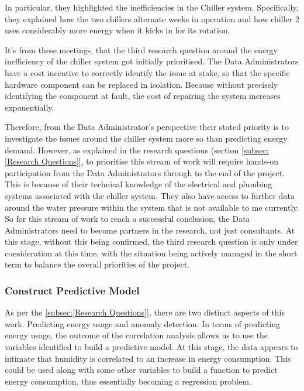 \documentclass[12pt]{scrartcl}
\begin{document}
In particular, they highlighted the inefficiencies in the Chiller system. Specifically, they explained how the two chillers alternate weeks in operation and how chiller 2 uses considerably more energy when it kicks in for its rotation.

It's from these meetings, that the third research question around the energy inefficiency of the chiller system got initially prioritised. The Data Administrators have a cost incentive to correctly identify the issue at stake, so that the specific hardware component can be replaced in isolation. Because without precisely identifying the component at fault, the cost of repairing the system increases exponentially. 

Therefore, from the Data Administrator's perspective their stated priority is to investigate the issues around the chiller system more so than predicting energy demand. However, as explained in the research questions (section \ref{subsec:[Research Questions]}, to prioritise this stream of work will require hands-on participation from the Data Administrators through to the end of the project. This is because of their technical knowledge of the electrical and plumbing systems associated with the chiller system. They also have access to further data around the water pressure within the system that is not available to me currently. So for this stream of work to reach a successful conclusion, the Data Administrators need to become partners in the research, not just consultants. At this stage, without this being confirmed, the third research question is only under consideration at this time, with the situation being actively managed in the short term to balance the overall priorities of the project.  


\subsubsection{Construct Predictive Model}
\label{subsubsec:[Construct Predictive Model]}

As per the \ref{subsec:[Research Questions]}, there are two distinct aspects of this work. Predicting energy usage and anomaly detection. In terms of predicting energy usage, the outcome of the correlation analysis allows us to use the variables identified to build a predictive model. At this stage, the data appears to intimate that humidity is correlated to an increase in energy consumption. This could be used along with some other variables to build a function to predict energy consumption, thus essentially becoming a regression problem. 
\end{document}
